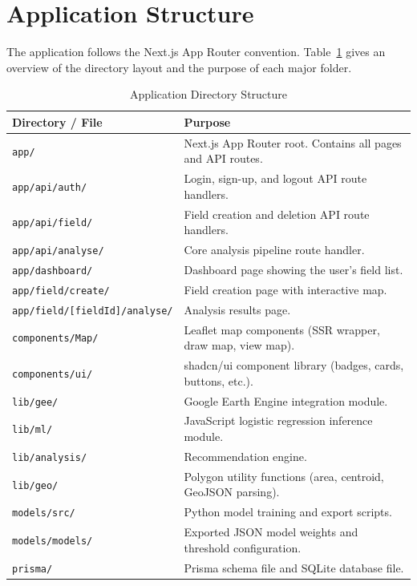 \section{Application Structure}

The application follows the Next.js App Router convention. Table~\ref{tab:structure} gives an overview of the directory layout and the purpose of each major folder.

\begin{table}[H]
  \centering
  \caption{Application Directory Structure}
  \label{tab:structure}
  \begin{tabularx}{\textwidth}{p{4.5cm} X}
    \toprule
    \textbf{Directory / File} & \textbf{Purpose} \\
    \midrule
    \texttt{app/}                   & Next.js App Router root. Contains all pages and API routes. \\
    \texttt{app/api/auth/}          & Login, sign-up, and logout API route handlers. \\
    \texttt{app/api/field/}         & Field creation and deletion API route handlers. \\
    \texttt{app/api/analyse/}       & Core analysis pipeline route handler. \\
    \texttt{app/dashboard/}         & Dashboard page showing the user's field list. \\
    \texttt{app/field/create/}      & Field creation page with interactive map. \\
    \texttt{app/field/[fieldId]/analyse/} & Analysis results page. \\
    \texttt{components/Map/}        & Leaflet map components (SSR wrapper, draw map, view map). \\
    \texttt{components/ui/}         & shadcn/ui component library (badges, cards, buttons, etc.). \\
    \texttt{lib/gee/}               & Google Earth Engine integration module. \\
    \texttt{lib/ml/}                & JavaScript logistic regression inference module. \\
    \texttt{lib/analysis/}          & Recommendation engine. \\
    \texttt{lib/geo/}               & Polygon utility functions (area, centroid, GeoJSON parsing). \\
    \texttt{models/src/}            & Python model training and export scripts. \\
    \texttt{models/models/}         & Exported JSON model weights and threshold configuration. \\
    \texttt{prisma/}                & Prisma schema file and SQLite database file. \\
    \bottomrule
  \end{tabularx}
\end{table}

